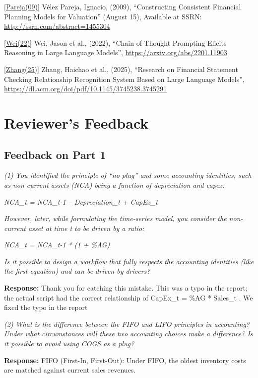 \documentclass[12pt,a4paper]{article}
\begin{document}
\hypertarget{ref:pareja09}{}\hyperlink{ref:pareja09}{[Pareja(09)]} Vélez Pareja, Ignacio, (2009), ``Constructing
Consistent Financial Planning Models for Valuation'' (August 15),
Available at SSRN: \url{http://ssrn.com/abstract=1455304}

\hypertarget{ref:wei22}{}\hyperlink{ref:wei22}{[Wei(22)]} Wei, Jason et al., (2022), ``Chain-of-Thought Prompting
Elicits Reasoning in Large Language Models'',
\url{https://arxiv.org/abs/2201.11903}

\hypertarget{ref:zhang25}{}\hyperlink{ref:zhang25}{[Zhang(25)]} Zhang, Haichao et al., (2025), ``Research on Financial
Statement Checking Relationship Recognition System Based on Large
Language Models'',
\url{https://dl.acm.org/doi/pdf/10.1145/3745238.3745291}

\appendix

\section{Reviewer's Feedback}

\subsection{Feedback on Part 1}

\emph{(1) You identified the principle of ``no plug'' and some
accounting identities, such as non-current assets (NCA) being a function
of depreciation and capex:}

\emph{NCA\_t = NCA\_t-1 -- Depreciation\_t + CapEx\_t}

\emph{However, later, while formulating the time-series model, you
consider the non-current asset at time t to be driven by a ratio:}

\emph{NCA\_t = NCA\_t-1 * (1 + \%AG)}

\emph{Is it possible to design a workflow that fully respects the
accounting identities (like the first equation) and can be driven by
drivers?}

\textbf{Response:} Thank you for catching this mistake. This was a typo in
the report; the actual script had the correct relationship of CapEx\_t =
\%AG * Sales\_t . We fixed the typo in the report

\emph{(2) What is the difference between the FIFO and LIFO principles in
accounting? Under what circumstances will these two accounting choices
make a difference? Is it possible to avoid using COGS as a plug?}

\textbf{Response:} FIFO (First-In, First-Out): Under FIFO, the oldest
inventory costs are matched against current sales revenues.
\end{document}
